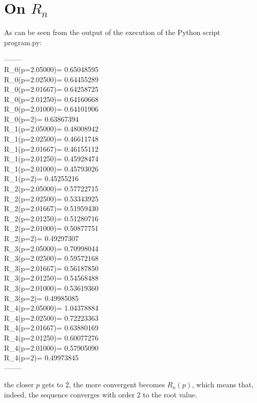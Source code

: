 \documentclass[paper=a4, fontsize=11pt]{scrartcl} %
\numberwithin{equation}{section} %
\numberwithin{figure}{section} %
\numberwithin{table}{section} %
\begin{document}
\section{On $R_{n}$}

As can be seen from the output of the execution of the Python script program.py:

--------\\
	R\_0(p=2.05000)= 0.65048595\\
	R\_0(p=2.02500)= 0.64455289\\
	R\_0(p=2.01667)= 0.64258725\\
	R\_0(p=2.01250)= 0.64160668\\
	R\_0(p=2.01000)= 0.64101906\\
	R\_0(p=2)= 0.63867394\\
	R\_1(p=2.05000)= 0.48008942\\
	R\_1(p=2.02500)= 0.46611748\\
	R\_1(p=2.01667)= 0.46155112\\
	R\_1(p=2.01250)= 0.45928474\\
	R\_1(p=2.01000)= 0.45793026\\
	R\_1(p=2)= 0.45255216\\
	R\_2(p=2.05000)= 0.57722715\\
	R\_2(p=2.02500)= 0.53343925\\
	R\_2(p=2.01667)= 0.51959430\\
	R\_2(p=2.01250)= 0.51280716\\
	R\_2(p=2.01000)= 0.50877751\\
	R\_2(p=2)= 0.49297307\\
	R\_3(p=2.05000)= 0.70998044\\
	R\_3(p=2.02500)= 0.59572168\\
	R\_3(p=2.01667)= 0.56187850\\
	R\_3(p=2.01250)= 0.54568488\\
	R\_3(p=2.01000)= 0.53619360\\
	R\_3(p=2)= 0.49985085\\
	R\_4(p=2.05000)= 1.04378884\\
	R\_4(p=2.02500)= 0.72223363\\
	R\_4(p=2.01667)= 0.63880169\\
	R\_4(p=2.01250)= 0.60077276\\
	R\_4(p=2.01000)= 0.57905090\\
	R\_4(p=2)= 0.49973845\\
--------

the closer $p$ gets to 2, the more convergent becomes $R_{n}(p)$, which means that, indeed, the sequence converges with order 2 to the root value.



{\color{red} }
\end{document}
